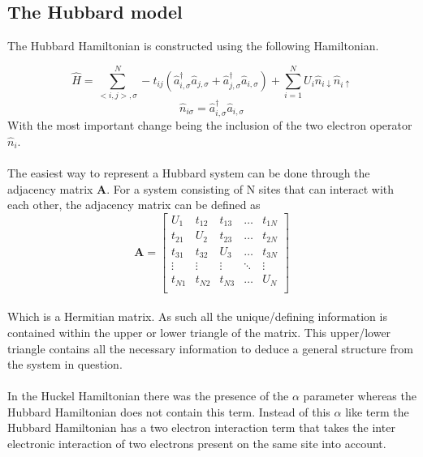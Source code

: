 \documentclass[12pt]{article}
\begin{document}
\subsection{The Hubbard model}

The Hubbard Hamiltonian is constructed using the following Hamiltonian.\cite{Surj1989}

\begin{equation}
\hat{H} = \sum_{<i,j>,\sigma}^{N}-t_{ij}\left (\hat{a}_{i,\sigma}^{\dagger} \hat{a}_{j,\sigma} + \hat{a}_{j,\sigma}^{\dagger} \hat{a}_{i,\sigma} \right) + \sum_{i=1}^{N}U_i \hat{n}_{i\downarrow}\hat{n}_{i\uparrow}
\end{equation}
\begin{equation*}
\hat{n}_{i\sigma} = \hat{a}_{i,\sigma}^{\dagger} \hat{a}_{i,\sigma}
\end{equation*}
With the most important change being the inclusion of the two electron operator $\hat{n}_i$.
\\
\\
The easiest way to represent a Hubbard system can be done through the adjacency matrix  \textbf{A}. For a system consisting of N sites that can interact with each other, the adjacency matrix can be defined as
\begin{equation}
\textbf{A}=
\begin{bmatrix}
U_1 & t_{12} & t_{13} & \dots & t_{1N} \\
t_{21} & U_2 &t_{23} & \dots & t_{2N} \\
t_{31} & t_{32} & U_3 & \dots & t_{3N} \\
\vdots & \vdots & \vdots & \ddots & \vdots \\
t_{N1} & t_{N2} & t_{N3} & \dots & U_N \\
\end{bmatrix}
\end{equation}
\\
Which is a Hermitian matrix. As such all the unique/defining information is contained within the upper or lower triangle of the matrix.  This upper/lower triangle contains all the necessary information to deduce a general structure from the system in question. 
\\
\\
In the Huckel Hamiltonian there was the presence of the $\alpha$ parameter whereas the Hubbard Hamiltonian does not contain this term. Instead of this $\alpha$ like term the Hubbard Hamiltonian has a two electron interaction term that takes the inter electronic interaction of two electrons present on the same site into account.
\end{document}

